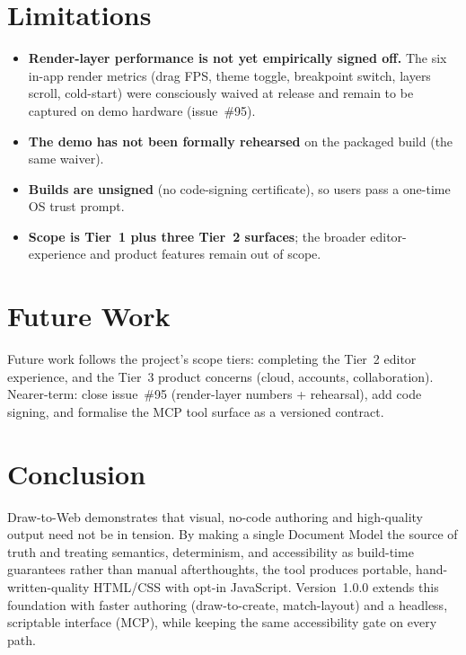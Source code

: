 \section{Limitations}
\begin{itemize}[leftmargin=1.5em]
  \item \textbf{Render-layer performance is not yet empirically signed off.} The
        six in-app render metrics (drag FPS, theme toggle, breakpoint switch,
        layers scroll, cold-start) were consciously waived at release and remain
        to be captured on demo hardware (issue~\#95).
  \item \textbf{The demo has not been formally rehearsed} on the packaged build
        (the same waiver).
  \item \textbf{Builds are unsigned} (no code-signing certificate), so users pass
        a one-time OS trust prompt.
  \item \textbf{Scope is Tier~1 plus three Tier~2 surfaces}; the broader
        editor-experience and product features remain out of scope.
\end{itemize}

\section{Future Work}
Future work follows the project's scope tiers: completing the Tier~2 editor
experience, and the Tier~3 product concerns (cloud, accounts, collaboration).
Nearer-term: close issue~\#95 (render-layer numbers + rehearsal), add code
signing, and formalise the MCP tool surface as a versioned contract.

\section{Conclusion}
Draw-to-Web demonstrates that visual, no-code authoring and high-quality output
need not be in tension. By making a single Document Model the source of truth and
treating semantics, determinism, and accessibility as build-time guarantees rather
than manual afterthoughts, the tool produces portable, hand-written-quality
HTML/CSS with opt-in JavaScript. Version~1.0.0 extends this foundation with
faster authoring (draw-to-create, match-layout) and a headless, scriptable
interface (MCP), while keeping the same accessibility gate on every path.

